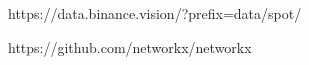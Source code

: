 



https://data.binance.vision/?prefix=data/spot/

https://github.com/networkx/networkx

\nocite{*}